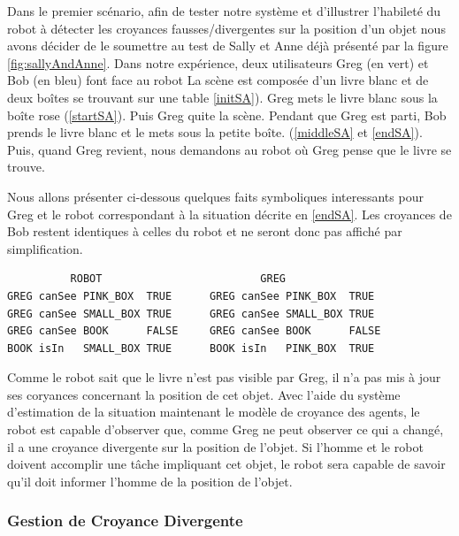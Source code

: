\documentclass[a4paper,11pt,twoside]{StyleThese}
\begin{document}
Dans le premier scénario, afin de tester notre système et d'illustrer l'habileté du robot à détecter les croyances fausses/divergentes sur la position d'un objet nous avons décider de le soumettre au test de Sally et Anne déjà présenté par la figure \ref{fig:sallyAndAnne}. Dans notre expérience, deux utilisateurs Greg (en vert) et Bob (en bleu) font face au robot
La scène est composée d'un livre blanc et de deux boîtes se trouvant sur une table \ref{initSA}).
Greg mets le livre blanc sous la boîte rose (\ref{startSA}). Puis Greg quite la scène. Pendant que Greg est parti, Bob prends le livre blanc et le mets sous la petite boîte. (\ref{middleSA} et \ref{endSA}).
Puis, quand Greg revient, nous demandons au robot où Greg pense que le livre se trouve.





Nous allons présenter ci-dessous quelques faits symboliques interessants pour Greg et le robot correspondant à la situation décrite en \ref{endSA}. Les croyances de Bob restent identiques à celles du robot et ne seront donc pas affiché par simplification.
\begin{scriptsize}
\begin{verbatim}
          ROBOT                         GREG
GREG canSee PINK_BOX  TRUE      GREG canSee PINK_BOX  TRUE
GREG canSee SMALL_BOX TRUE      GREG canSee SMALL_BOX TRUE
GREG canSee BOOK      FALSE     GREG canSee BOOK      FALSE
BOOK isIn   SMALL_BOX TRUE      BOOK isIn   PINK_BOX  TRUE

\end{verbatim}
\end{scriptsize}

Comme le robot sait que le livre n'est pas visible par Greg, il n'a pas mis à jour ses coryances concernant la position de cet objet. Avec l'aide du système d'estimation de la situation maintenant le modèle de croyance des agents, le robot est capable d'observer que, comme Greg ne peut observer ce qui a changé, il a une croyance divergente sur la position de l'objet. Si l'homme et le robot doivent accomplir une tâche impliquant cet objet, le robot sera capable de savoir qu'il doit informer l'homme de la position de l'objet.

\subsubsection{Gestion de Croyance Divergente}
\end{document}
